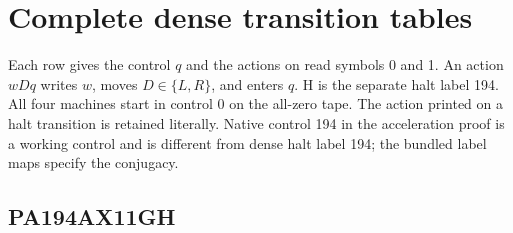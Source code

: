 \section{Complete dense transition tables}
\label{app:tables}
Each row gives the control $q$ and the actions on read symbols 0 and 1. An action $wDq$ writes $w$, moves $D\in\{L,R\}$, and enters $q$. H is the separate halt label 194. All four machines start in control 0 on the all-zero tape. The action printed on a halt transition is retained literally. Native control 194 in the acceleration proof is a working control and is different from dense halt label 194; the bundled label maps specify the conjugacy.
\subsection{PA194AX11GH}
\begingroup\scriptsize
\setlength{\tabcolsep}{5pt}
\renewcommand{\arraystretch}{1.07}
